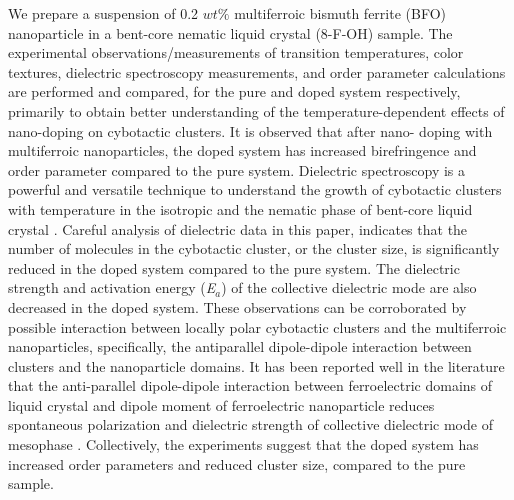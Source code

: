 \documentclass[reprint,amsfonts,amsmath,amssymb,aps,pre,floatfix,10pt]{revtex4-1}
\begin{document}
We prepare a suspension of 0.2 $ wt\%$ multiferroic bismuth ferrite (BFO) nanoparticle in a bent-core nematic liquid crystal (8-F-OH) sample. The experimental observations/measurements of transition temperatures, color textures, dielectric spectroscopy measurements, and order parameter calculations are performed and compared, for the pure and doped system respectively, primarily to obtain better understanding of the temperature-dependent effects of nano-doping on cybotactic clusters. It is observed that after nano- doping with multiferroic nanoparticles, the doped system has increased birefringence and order parameter compared to the pure system. Dielectric spectroscopy is a powerful and versatile technique to understand the growth of cybotactic clusters with temperature in the isotropic and the nematic phase of bent-core liquid crystal \cite{panarin2018formation_31}. Careful analysis of dielectric data in this paper, indicates that the number of molecules in the cybotactic cluster, or the cluster size, is significantly reduced in the doped system compared to the pure system. The dielectric strength and activation energy (\textit{E$_a$}) of the collective dielectric mode are also decreased in the doped system. These observations can be corroborated by possible interaction between locally polar cybotactic clusters and the multiferroic nanoparticles, specifically, the antiparallel dipole-dipole interaction between clusters and the nanoparticle domains. It has been reported well in the literature that the anti-parallel dipole-dipole interaction between ferroelectric domains of liquid crystal and dipole moment of ferroelectric nanoparticle reduces spontaneous polarization and dielectric strength of collective dielectric mode of mesophase \cite{shukla2014electro_32, derbali2020dielectric_33, mikulko2009complementary_34, ghosh2011effect_35}. Collectively, the experiments suggest that the doped system has increased order parameters and reduced cluster size, compared to the pure sample.
 
\end{document}
